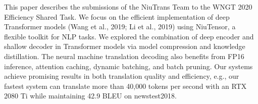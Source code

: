 This paper describes the submissions of the NiuTrans Team to the WNGT 2020 Efficiency Shared Task. We focus on the efficient implementation of deep Transformer models (Wang et al., 2019; Li et al., 2019) using NiuTensor, a flexible toolkit for NLP tasks. We explored the combination of deep encoder and shallow decoder in Transformer models via model compression and knowledge distillation. The neural machine translation decoding also benefits from FP16 inference, attention caching, dynamic batching, and batch pruning. Our systems achieve promising results in both translation quality and efficiency, e.g., our fastest system can translate more than 40,000 tokens per second with an RTX 2080 Ti while maintaining 42.9 BLEU on newstest2018.
